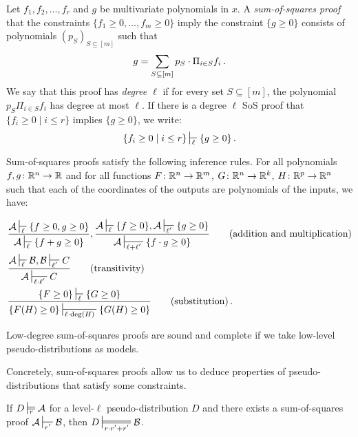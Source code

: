 Let $f_1, f_2, \ldots, f_r$ and $g$ be multivariate polynomials in $x$.
A \emph{sum-of-squares proof} that the constraints $\{f_1 \geq 0, \ldots, f_m \geq 0\}$ imply the constraint $\{g \geq 0\}$ consists of  polynomials $(p_S)_{S \subseteq [m]}$ such that
\begin{equation}
g = \sum_{S \subseteq [m]} p_S \cdot \Pi_{i \in S} f_i
\,.
\end{equation}
We say that this proof has \emph{degree $\ell$} if for every set $S \subseteq [m]$, the polynomial $p_S \Pi_{i \in S} f_i$ has degree at most $\ell$.
If there is a degree $\ell$ SoS proof that $\{f_i \geq 0 \mid i \leq r\}$ implies $\{g \geq 0\}$, we write:
\begin{equation}
  \{f_i \geq 0 \mid i \leq r\} \sststile{\ell}{}\{g \geq 0\}
  \mper
\end{equation}


Sum-of-squares proofs satisfy the following inference rules.
For all polynomials $f,g\colon\mathbb R^n \to \mathbb R$ and for all functions $F\colon \mathbb R^n \to \mathbb R^m$, $G\colon \mathbb R^n \to \mathbb R^k$, $H\colon \mathbb R^{p} \to \mathbb R^n$ such that each of the coordinates of the outputs are polynomials of the inputs, we have:

\begin{align}
&\frac{\cA \sststile{\ell}{} \{f \geq 0, g \geq 0 \} } {\cA \sststile{\ell}{} \{f + g \geq 0\}}, \frac{\cA \sststile{\ell}{} \{f \geq 0\}, \cA \sststile{\ell'}{} \{g \geq 0\}} {\cA \sststile{\ell+\ell'}{} \{f \cdot g \geq 0\}} \tag{addition and multiplication}\\
&\frac{\cA \sststile{\ell}{} \cB, \cB \sststile{\ell'}{} C}{\cA \sststile{\ell \cdot \ell'}{} C}  \tag{transitivity}\\
&\frac{\{F \geq 0\} \sststile{\ell}{} \{G \geq 0\}}{\{F(H) \geq 0\} \sststile{\ell \cdot \deg(H)} {} \{G(H) \geq 0\}} \tag{substitution}\mper
\end{align}

Low-degree sum-of-squares proofs are sound and complete if we take low-level pseudo-distributions as models.

Concretely, sum-of-squares proofs allow us to deduce properties of pseudo-distributions that satisfy some constraints.

\begin{fact}[Soundness]
  \label{fact:sos-soundness}
  If $D \sdtstile{r}{} \cA$ for a level-$\ell$ pseudo-distribution $D$ and there exists a sum-of-squares proof $\cA \sststile{r'}{} \cB$, then $D \sdtstile{r\cdot r'+r'}{} \cB$.
\end{fact}

